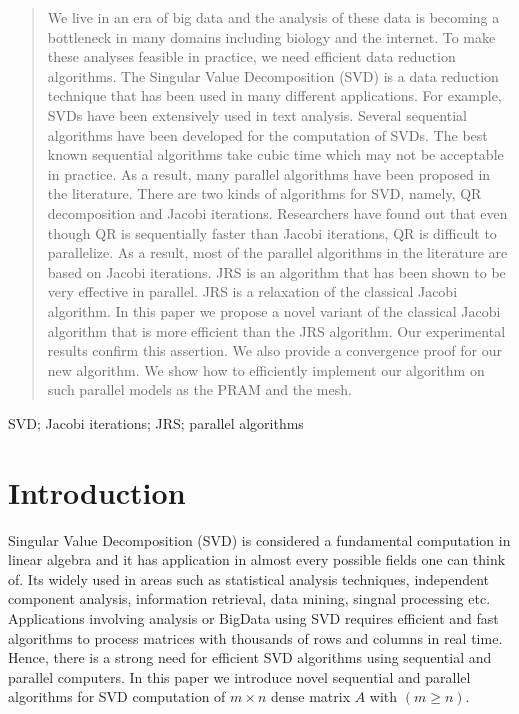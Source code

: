 \documentclass[10pt, conference, compsocconf]{IEEEtran}
\begin{document}
\begin{abstract}
We live in an era of big data and the analysis of these data is becoming a bottleneck in many domains including biology and the internet. To make these analyses feasible in practice, we need efficient data reduction algorithms. The Singular Value Decomposition (SVD) is a data reduction technique that has been used in many different applications. For example, SVDs have been extensively used in text analysis. Several sequential algorithms have been developed for the computation of SVDs. The best known sequential algorithms take cubic time which may not be acceptable in practice. As a result, many parallel algorithms have been proposed in the literature. There are two kinds of algorithms for SVD, namely, QR decomposition and Jacobi iterations. Researchers have found out that even though QR is sequentially faster than Jacobi iterations, QR is difficult to parallelize. As a result, most of the parallel algorithms in the literature are based on Jacobi iterations. JRS is an algorithm that has been shown to be very effective in parallel. JRS is a relaxation of the classical Jacobi algorithm. In this paper we propose a novel variant of the classical Jacobi algorithm that is more efficient than the JRS algorithm. Our experimental results confirm this assertion. We also provide a convergence proof for our new algorithm. We show how to efficiently implement our algorithm on such parallel models as the PRAM and the mesh. 
\end{abstract}

\begin{IEEEkeywords}
SVD; Jacobi iterations; JRS; parallel algorithms
\end{IEEEkeywords}


%
\IEEEpeerreviewmaketitle



\section{Introduction}
Singular Value Decomposition (SVD) is considered a fundamental computation in linear algebra and it has application in almost every possible fields one can think of. Its widely used in areas such as statistical analysis techniques, independent component analysis, information retrieval, data mining, singnal processing etc. Applications involving analysis or BigData using SVD requires efficient and fast algorithms to process matrices with thousands of rows and columns in real time. Hence, there is a strong need for efficient SVD algorithms using sequential and parallel computers. In this paper we introduce novel sequential and parallel algorithms for SVD computation of $m \times n$ dense matrix $A$ with $(m \geq n)$. 
\end{document}

